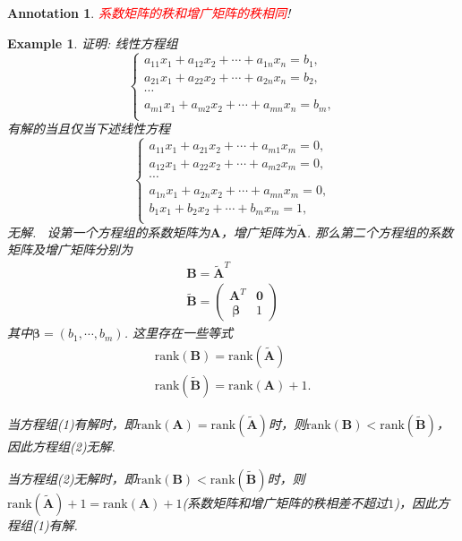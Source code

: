 \documentclass{article}
\newtheorem{example}[theorem]{Example}
\newtheorem{annotation}[theorem]{Annotation}
\newcommand{\hints}{{\color{blue} \text{hints}}}
\newcommand{\mbf}[1]{\bm{#1}}
\newcommand{\rank}[1]{\text{rank}\left(#1\right)} %
\newcommand{\redt}[1]{\textcolor{red}{#1}}
\begin{document}
\begin{annotation}
\rm \redt{系数矩阵的秩和增广矩阵的秩相同}!
\end{annotation}

\begin{example}
\rm 证明: 线性方程组
$$
\left\{
\begin{array}{l}
a_{11}x_1 + a_{12}x_2 + \cdots + a_{1n}x_n = b_1, \\
a_{21}x_1 + a_{22}x_2 + \cdots + a_{2n}x_n = b_2, \\
\cdots \\
a_{m1}x_1 + a_{m2}x_2 + \cdots + a_{mn}x_n = b_m, \\
\end{array} \right.
$$
有解的当且仅当下述线性方程
$$
\left\{
\begin{array}{l}
a_{11}x_1 + a_{21}x_2 + \cdots + a_{m1}x_m = 0, \\
a_{12}x_1 + a_{22}x_2 + \cdots + a_{m2}x_m = 0, \\
\cdots \\
a_{1n}x_1 + a_{2n}x_2 + \cdots +a_{mn}x_m = 0, \\
b_{1}x_1 + b_{2}x_2 + \cdots+ b_{m}x_m = 1, \\
\end{array} \right.
$$
无解. 
\hints\ 设第一个方程组的系数矩阵为$\mbf{A}$，增广矩阵为$\tilde{\mbf{A}}$. 那么第二个方程组的系数矩阵及增广矩阵分别为
$$
\begin{array}{ll}
\mbf{B} = \tilde{\mbf{A}}^T \\
\tilde{\mbf{B}}= \begin{pmatrix}
\mbf{A}^T & \mbf{0} \\\
\mbf{\beta} & 1
\end{pmatrix}
\end{array}
$$
其中$\mbf{\beta} = (b_1,\cdots,b_m)$. 这里存在一些等式
$$
\begin{array}{ll}
\rank{\mbf{B}} = \rank{\tilde{\mbf{A}}} \\
\rank{\tilde{\mbf{B}}} = \rank{\mbf{A}} + 1.
\end{array}
$$

当方程组(1)有解时，即$\rank{\mbf{A}} = \rank{\tilde{\mbf{A}}}$时，则$\rank{\mbf{B}} < \rank{\tilde{\mbf{B}}}$，因此方程组(2)无解. 

当方程组(2)无解时，即$\rank{\mbf{B}} < \rank{\tilde{\mbf{B}}}$时，则$\rank{\tilde{\mbf{A}}} + 1 = \rank{\mbf{A}} + 1$(系数矩阵和增广矩阵的秩相差不超过$1$)，因此方程组(1)有解.
\end{example}
\end{document}
